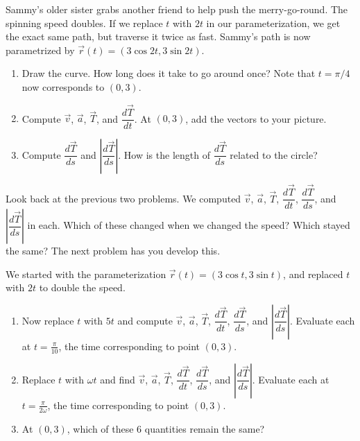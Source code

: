 \begin{problem}
 Sammy's older sister grabs another friend to help push the merry-go-round. The spinning speed doubles. If we replace $t$ with $2t$ in our parameterization, we get the exact same path, but traverse it twice as fast.  Sammy's path is now parametrized by $\vec r(t) = (3\cos 2t, 3\sin 2t)$.
\begin{enumerate}
 \item Draw the curve. How long does it take to go around once?  Note that $t=\pi/4$ now corresponds to $(0,3)$. 
 \item Compute $\vec v$, $\vec a$, $\vec T$, and $\dfrac{d\vec T}{dt}$. At $(0,3)$, add the vectors to your picture.
 \item Compute $\dfrac{d\vec T}{ds}$ and $\left|\dfrac{d\vec T}{ds}\right|$. How is the length of $\dfrac{d\vec T}{ds}$ related to the circle?  
\end{enumerate}
\end{problem}

Look back at the previous two problems.  We computed $\vec v$, $\vec a$, $\vec T$, $\dfrac{d\vec T}{dt}$, $\dfrac{d\vec T}{ds}$, and $\left|\dfrac{d\vec T}{ds}\right|$ in each. Which of these changed when we changed the speed?  Which stayed the same? The next problem has you develop this. 

\begin{problem}
We started with the parameterization $\vec r(t) = (3\cos t, 3\sin t)$, and replaced $t$ with $2t$ to double the speed. 
\begin{enumerate}
 \item Now replace $t$ with $5t$ and compute $\vec v$, $\vec a$, $\vec T$, $\dfrac{d\vec T}{dt}$, $\dfrac{d\vec T}{ds}$, and $\left|\dfrac{d\vec T}{ds}\right|$. Evaluate each at $t=\frac{\pi}{10}$, the time corresponding to point $(0,3)$.
 \item Replace $t$ with $\omega t$ and find $\vec v$, $\vec a$, $\vec T$, $\dfrac{d\vec T}{dt}$, $\dfrac{d\vec T}{ds}$, and $\left|\dfrac{d\vec T}{ds}\right|$. Evaluate each at $t=\frac{\pi}{2\omega}$, the time corresponding to point $(0,3)$.
 \item At $(0,3)$, which of these 6 quantities remain the same?
\end{enumerate}
\end{problem}

